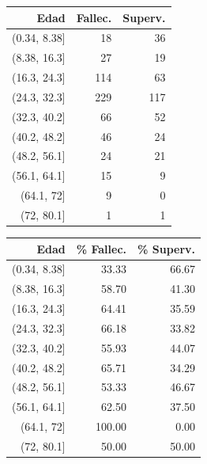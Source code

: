 \documentclass{article}
\begin{document}
\begin{table}[htbp]
    \centering
    \begin{minipage}{.5\textwidth}
        \centering
        \begin{tabular}{rrr}
            \hline
            Edad & Fallec. & Superv. \\ 
            \hline
            (0.34, 8.38] &  18 &  36 \\ 
            (8.38, 16.3] &  27 &  19 \\ 
            (16.3, 24.3] & 114 &  63 \\ 
            (24.3, 32.3] & 229 & 117 \\ 
            (32.3, 40.2] &  66 &  52 \\ 
            (40.2, 48.2] &  46 &  24 \\ 
            (48.2, 56.1] &  24 &  21 \\ 
            (56.1, 64.1] &  15 &   9 \\ 
            (64.1, 72] &   9 &   0 \\ 
            (72, 80.1] &   1 &   1 \\ 
            \hline
        \end{tabular}
    \end{minipage}%
    \begin{minipage}{.5\textwidth}
        \centering
        \begin{tabular}{rrr}
            \hline
            Edad & \% Fallec. & \% Superv. \\ 
            \hline
            (0.34, 8.38] & 33.33 & 66.67 \\ 
            (8.38, 16.3] & 58.70 & 41.30 \\ 
            (16.3, 24.3] & 64.41 & 35.59 \\ 
            (24.3, 32.3] & 66.18 & 33.82 \\ 
            (32.3, 40.2] & 55.93 & 44.07 \\ 
            (40.2, 48.2] & 65.71 & 34.29 \\ 
            (48.2, 56.1] & 53.33 & 46.67 \\ 
            (56.1, 64.1] & 62.50 & 37.50 \\ 
            (64.1, 72] & 100.00 & 0.00 \\ 
            (72, 80.1] & 50.00 & 50.00 \\ 
            \hline
        \end{tabular}
    \end{minipage}
\end{table}
\end{document}
